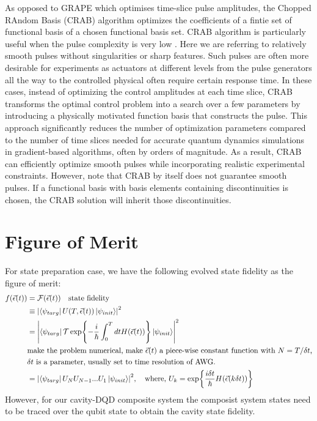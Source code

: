 \documentclass[12pt]{report}
\begin{document}
As opposed to GRAPE which optimises time-slice pulse amplitudes, the Chopped RAndom Basis (CRAB) algorithm optimizes the coefficients of a fintie set of functional basis of a chosen functional basis set. 
CRAB algorithm is particularly useful when the pulse complexity is very low \cite{PhysRevLett.106.190501, PhysRevA.84.022326}.
Here we are referring to relatively smooth pulses without singularities or sharp features. 
Such pulses are often more desirable for experiments as actuators at different levels from the pulse generators all the way to the controlled physical often require certain response time. 
In these cases, instead of optimizing the control amplitudes at each time slice, CRAB transforms the optimal control problem into a search over a few parameters by introducing a physically motivated function basis that constructs the pulse. 
This approach significantly reduces the number of optimization parameters compared to the number of time slices needed for accurate quantum dynamics simulations in gradient-based algorithms, often by orders of magnitude. 
As a result, CRAB can efficiently optimize smooth pulses while incorporating realistic experimental constraints.
However, note that CRAB by itself does not guarantee smooth pulses. If a functional basis with basis elements containing discontinuities is chosen, the CRAB solution will inherit those discontinuities.
\section{Figure of Merit}\label{sec:figure_of_merit}
For state preparation case, we have the following evolved state fidelity as the figure of merit:
\begin{align*}
    f(\vec{\epsilon}(t)) &= \mathcal{F}(\vec{\epsilon}(t)) \quad \text{state fidelity}\\
    &\equiv \abs{\bra{\psi_{targ}} U(T,\vec{\epsilon}(t)) \ket{\psi_{init}}}^2 \\
    &= \abs{\bra{\psi_{targ}} 
        \mathcal{T}\exp{-\frac{i}{\hbar}\int_0^T dt H(\vec{\epsilon}(t))}
        \ket{\psi_{init}}}^2 \\
    &\text{make the problem numerical, make $\vec{\epsilon}(t)$ a piece-wise constant function with $N=T/\delta t$,} \\
    &\text{$\delta t$ is a parameter, usually set to time resolution of AWG.} \\
    &= \abs{\bra{\psi_{targ}} 
        U_NU_{N-1}...U_1
        \ket{\psi_{init}}}^2, \quad \text{where, } U_k=\exp{\frac{i\delta t}{\hbar}H(\vec{\epsilon}(k\delta t))} \\
\end{align*}
However, for our cavity-DQD composite system the composist system states need to be traced over the qubit state to obtain the cavity state fidelity. 
\end{document}
